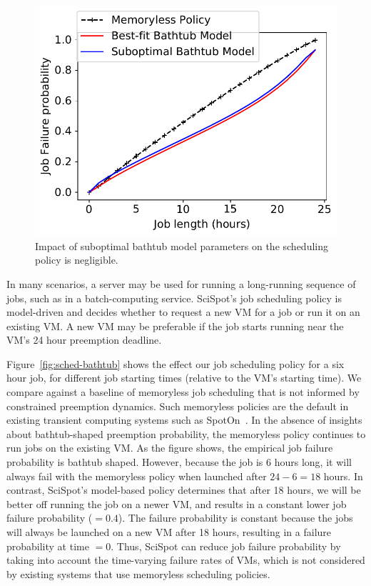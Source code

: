 \documentclass[compsoc]{IEEEtran}
\newcommand{\sysname}{SciSpot\xspace}
\begin{document}
\begin{figure}
\begin{minipage}[c]{0.3\linewidth}
    \includegraphics[width=\linewidth]{wrong-model.pdf}
    \vspace*{-0.8cm}
  \caption{Impact of suboptimal bathtub model parameters on the scheduling policy is negligible.}
  \label{fig:wrong-model}
\end{minipage}
\vspace*{-0.4cm}
\end{figure}


In many scenarios, a server may be used for running a long-running sequence of jobs, such as in a batch-computing service. 
SciSpot's job scheduling policy is model-driven and decides whether to request a new VM for a job or run it on an existing VM.
A new VM may be preferable if the job starts running near the VM's 24 hour preemption deadline.

Figure~\ref{fig:sched-bathtub} shows the effect our job scheduling policy for a six hour job, for different job starting times (relative to the VM's starting time). 
We compare against a baseline of memoryless job scheduling that is not informed by constrained preemption dynamics.
Such memoryless policies are the default in existing transient computing systems such as SpotOn~\cite{spoton}. 
In the absence of insights about bathtub-shaped preemption probability, the memoryless policy continues to run jobs on the existing VM. 
As the figure shows, the empirical job failure probability is bathtub shaped. 
However, because the job is 6 hours long, it will always fail with the memoryless policy when launched after $24-6=18$ hours.
In contrast, \sysname's model-based policy determines that after 18 hours, we will be better off running the job on a newer VM, and results in a constant lower job failure probability ($=0.4$). The failure probability is constant because the jobs will always be launched on a new VM after 18 hours, resulting in a failure probability at time $=0$. 
Thus, \sysname can reduce job failure probability by taking into account the time-varying failure rates of VMs, which is not considered by existing systems that use memoryless scheduling policies. 
\end{document}
